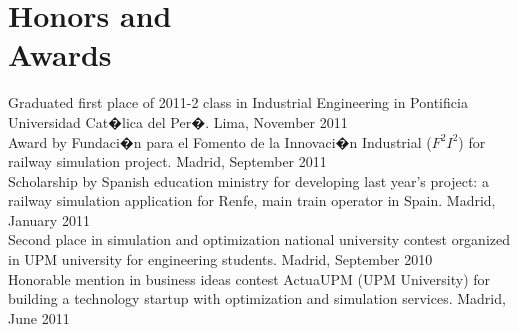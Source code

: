 	\section{Honors and\\Awards }
   
   				Graduated first place of 2011-2 class in Industrial Engineering in Pontificia Universidad Cat�lica del Per�. \hfill Lima, November 2011 \vspace{1mm} \\
    			Award by Fundaci�n para el Fomento de la Innovaci�n Industrial ($F^2I^2$) for railway simulation project. \hfill Madrid, September 2011 \vspace{1mm} \\
    			Scholarship by Spanish education ministry for developing last year's project: a railway simulation application for Renfe, main train operator in Spain. \hfill Madrid, January 2011 \vspace{1mm}\\%
   				Second place in simulation and optimization national university contest organized in UPM university for engineering students. \hfill Madrid, September 2010 \vspace{1mm}\\%
   				Honorable mention in business ideas contest ActuaUPM (UPM University) for building a technology startup with optimization and simulation services. \hfill Madrid, June 2011 \vspace{1mm}\\%
